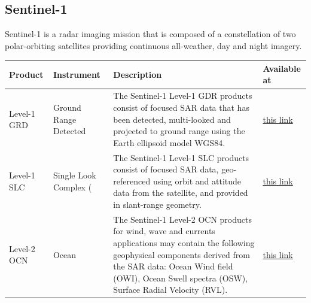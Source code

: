 \documentclass[
  letterpaper,
  DIV=11,
  numbers=noendperiod]{scrreprt}
\begin{document}
\subsection{Sentinel-1}\label{sentinel-1}

Sentinel-1 is a radar imaging mission that is composed of a
constellation of two polar-orbiting satellites providing continuous
all-weather, day and night imagery.

\begin{longtable}[]{@{}
  >{\raggedright\arraybackslash}p{}
  >{\raggedright\arraybackslash}p{}
  >{\raggedright\arraybackslash}p{}
  >{\raggedright\arraybackslash}p{}@{}}
\toprule\noalign{}
\begin{minipage}[b]{\linewidth}\raggedright
Product
\end{minipage} & \begin{minipage}[b]{\linewidth}\raggedright
Instrument
\end{minipage} & \begin{minipage}[b]{\linewidth}\raggedright
Description
\end{minipage} & \begin{minipage}[b]{\linewidth}\raggedright
Available at
\end{minipage} \\
\midrule\noalign{}
\endhead
\bottomrule\noalign{}
\endlastfoot
Level-1 GRD & Ground Range Detected & The Sentinel-1 Level-1 GDR
products consist of focused SAR data that has been detected,
multi-looked and projected to ground range using the Earth ellipsoid
model WGS84. &
\href{https://stac.browser.user.eopf.eodc.eu/collections/sentinel-1-l1-grd?.language=en}{this
link} \\
Level-1 SLC & Single Look Complex ( & The Sentinel-1 Level-1 SLC
products consist of focused SAR data, geo-referenced using orbit and
attitude data from the satellite, and provided in slant-range geometry.
&
\href{https://stac.browser.user.eopf.eodc.eu/collections/sentinel-1-l1-slc?.language=en}{this
link} \\
Level-2 OCN & Ocean & The Sentinel-1 Level-2 OCN products for wind, wave
and currents applications may contain the following geophysical
components derived from the SAR data: Ocean Wind field (OWI), Ocean
Swell spectra (OSW), Surface Radial Velocity (RVL). &
\href{https://stac.browser.user.eopf.eodc.eu/collections/sentinel-1-l2-ocn?.language=en}{this
link} \\
\end{longtable}
\end{document}

